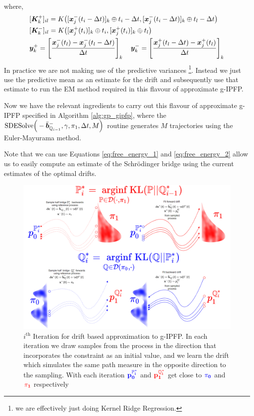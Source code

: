 \documentclass[a4paper,12pt,twoside,openright]{report}
\theoremstyle{definition}
\begin{document}
where,
\begin{align*}
   &[ \mK_k^{+} ]_{il} = {K}\big([\vx^{-}_j(t_i- \Delta t)]_k\oplus t_i - \Delta t, [\vx^{-}_j(t_i - \Delta t)]_k \oplus t_l - \Delta t \big) \\
   &[ \mK_k^{-} ]_{il} = {K}\big([\vx^{+}_j(t_i)]_k \oplus t_i , [\vx^{+}_j(t_i)]_k\oplus t_l \big)  \\
   &\vy_k^{+} =  \left[\frac{\vx^{-}_j(t_l) - \vx^{-}_j(t_l - \Delta t)}{\Delta t}\right]_k \quad \vy_k^{-} =  \left[\frac{\vx^{+}_j(t_l - \Delta t)  - \vx^{+}_j(t_l)}{\Delta t} \right]_k
\end{align*}
In practice we are not making use of the predictive variances \footnote{we are effectively just doing Kernel Ridge Regression.}. Instead we just use the predictive mean as an estimate for the drift and subsequently use that estimate to run the EM method required in this flavour of approximate g-IPFP.


Now we have the relevant ingredients to carry out this flavour of approximate g-IPFP specified in Algorithm  \ref{alg:gp_gipfp}, where the $\text{SDESolve}\Big(-\bar{\vb}^{-}_{\Q_{i-1}}, \gamma, \pi_1, \Delta t, M\Big)$ routine generates $M$ trajectories using the Euler-Mayurama method.

Note that we can use Equations \ref{eq:free_energy_1} and \ref{eq:free_energy_2} allow us to easily compute an estimate of the Schrödinger bridge using the current estimates of the optimal drifts.
\begin{landscape}
\begin{figure}
    \vspace{-2cm}
    \includegraphics[scale=0.7]{images/gp_IPFP.PNG}
    \caption{$i^{\text{th}}$ Iteration for drift based approximation to g-IPFP. In each iteration we draw samples from the process in the direction that incorporates the constraint as an initial value, and we learn the drift which simulates the same path measure in the opposite direction to the sampling. With each iteration $\mathbf{\color{blue}{p^{\P^{*}_i}_0}}$ and $\mathbf{\color{red}{p^{\Q^{*}_i}_1}}$ get close to $\mathbf{\color{blue}{\pi_0}}$ and $\mathbf{\color{red}{\pi_1}}$ respectively}
    \label{fig:gp_drift}
\end{figure}
\end{landscape}
 
\end{document}
